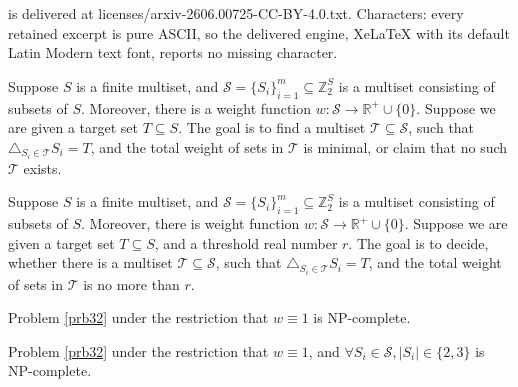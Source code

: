 \documentclass[10pt,a4paper]{amsart}
\newcommand{\R}{\mathbb{R}}
\newcommand{\Z}{\mathbb{Z}}
\newcommand{\mc}[1]{\mathcal{#1}}
\begin{document}
is delivered at licenses/arxiv-2606.00725-CC-BY-4.0.txt. Characters: every retained excerpt is pure ASCII, so the delivered engine, XeLaTeX with its default Latin Modern text font, reports no missing character.
	\begin{problem}[\it{WSSD}]\label{prb31}
		Suppose $S$ is a finite multiset, and $\mathcal{S}=\{S_i\}_{i=1}^{m}\subseteq\Z_2^S$ is a multiset consisting of subsets of $S$. Moreover, there is a weight function $w:\mc{S}\to\R^+\cup\{0\}$. Suppose we are given a target set $T\subseteq S$. The goal is to find a multiset $\mathcal{T}\subseteq\mc{S}$, such that $\triangle_{S_i\in\mc{T}}S_i=T$, and the total weight of sets in $\mc{T}$ is minimal, or claim that no such $\mc{T}$ exists.
	\end{problem} \par

	\begin{problem}\label{prb32}
		Suppose $S$ is a finite multiset, and $\mathcal{S}=\{S_i\}_{i=1}^{m}\subseteq\Z_2^S$ is a multiset consisting of subsets of $S$. Moreover, there is weight function $w:\mc{S}\to\R^+\cup\{0\}$. Suppose we are given a target set $T\subseteq S$, and a threshold real number $r$. The goal is to decide, whether there is a multiset $\mathcal{T}\subseteq\mc{S}$, such that $\triangle_{S_i\in\mc{T}}S_i=T$, and the total weight of sets in $\mc{T}$ is no more than $r$.
	\end{problem}

	\begin{theorem}\label{thm41}
		Problem \ref{prb32} under the restriction that $w\equiv 1$ is NP-complete.
	\end{theorem}

	\begin{theorem}
		Problem \ref{prb32} under the restriction that $w\equiv1$, and $\forall S_i\in\mc{S},|S_i|\in\{2,3\}$ is NP-complete. 
	\end{theorem}
\end{document}
